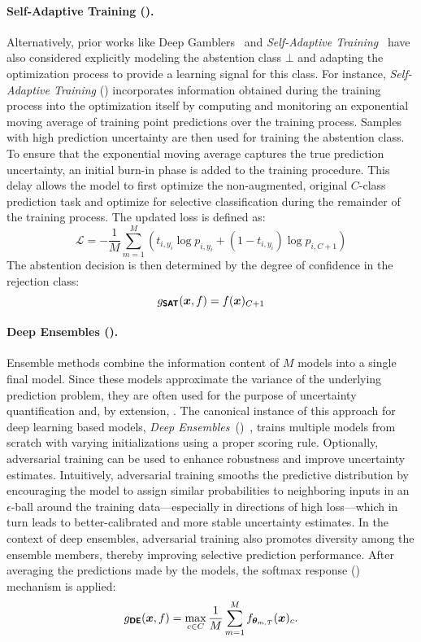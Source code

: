  \paragraph{Self-Adaptive Training (\sat).}
 Alternatively, prior works like Deep Gamblers~\citep{liu2019deep} and \emph{Self-Adaptive Training}~\citep{huang2020self} have also considered explicitly modeling the abstention class $\bot$ and adapting the optimization process to provide a learning signal for this class. For instance, \emph{Self-Adaptive Training} (\sat) incorporates information obtained during the training process into the optimization itself by computing and monitoring an exponential moving average of training point predictions over the training process. Samples with high prediction uncertainty are then used for training the abstention class. To ensure that the exponential moving average captures the true prediction uncertainty, an initial burn-in phase is added to the training procedure. This delay allows the model to first optimize the non-augmented, \ie original $C$-class prediction task and optimize for selective classification during the remainder of the training process. The updated loss is defined as:
 \begin{equation}
 	\mathcal{L} = -\frac{1}{M}\sum_{m=1}^{M} \left ( t_{i,y_i}\log p_{i,y_i} + (1-t_{i,y_i})\log p_{i,C+1} \right )
 \end{equation}
The abstention decision is then determined by the degree of confidence in the rejection class:
\begin{equation}
	g_{\textbf{\sffamily SAT}}(\bm{x}, f) = f(\bm{x})_{C+1}
\end{equation}

\paragraph{Deep Ensembles (\de).}
Ensemble methods combine the information content of $M$ models into a single final model. Since these models approximate the variance of the underlying prediction problem, they are often used for the purpose of uncertainty quantification and, by extension, \selp. The canonical instance of this approach for deep learning based models, \emph{Deep Ensembles}~(\de)~\citep{lakshminarayanan2017simple}, trains multiple models from scratch with varying initializations using a proper scoring rule. Optionally, adversarial training can be used to enhance robustness and improve uncertainty estimates. Intuitively, adversarial training smooths the predictive distribution by encouraging the model to assign similar probabilities to neighboring inputs in an $\epsilon$-ball around the training data---especially in directions of high loss---which in turn leads to better-calibrated and more stable uncertainty estimates. In the context of deep ensembles, adversarial training also promotes diversity among the ensemble members, thereby improving selective prediction performance. After averaging the predictions made by the models, the softmax response (\sr) mechanism is applied:
\begin{equation}
    g_{\textbf{\sffamily DE}}(\bm{x}, f) = \max_{c \in C} \frac{1}{M} \sum_{m=1}^{M} f_{\bm{\theta}_{m,T}}(\bm{x})_c.
\end{equation}

